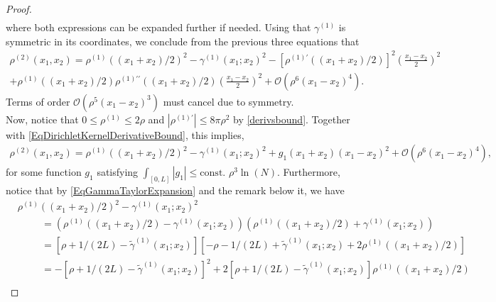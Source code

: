 \documentclass[a4paper,11pt]{article}
\newcommand{\abs}[1]{\left\lvert #1 \right\rvert}
\numberwithin{equation}{section}
\begin{document}
\begin{proof}
\begin{equation}
\begin{aligned}
		\end{aligned}
		\end{equation}
		where both expressions can be expanded further if needed. Using that $ \gamma^{(1)} $ is symmetric in its coordinates, we conclude from the previous three equations that \begin{equation}
		\begin{aligned}
		\rho^{(2)}(x_1,x_2)=\rho^{(1)}((x_1+x_2)/2)^2-\gamma^{(1)}(x_1;x_2)^2-\left[\rho^{(1)\prime}((x_1+x_2)/2)\right]^2\left(\frac{x_1-x_2}{2}\right)^2\\+\rho^{(1)}((x_1+x_2)/2)\rho^{(1)\prime\prime}((x_1+x_2)/2)\left(\frac{x_1-x_2}{2}\right)^2+\mathcal{O}(\rho^6(x_1-x_2)^4).
		\end{aligned}
		\end{equation}
		Terms of order $ \mathcal{O}(\rho^5(x_1-x_2)^3) $ must cancel due to symmetry.\\
		Now, notice that $ 0\leq\rho^{(1)}\leq 2\rho $ and $\abs{\rho^{(1)'}}\leq 8\pi \rho^2 $ by \eqref{derivsbound}. Together with \eqref{EqDirichletKernelDerivativeBound}, this implies,
		\begin{equation}
		\begin{aligned}
            \label{firsteqlem}
		\rho^{(2)}(x_1,x_2)=\rho^{(1)}((x_1+x_2)/2)^2-\gamma^{(1)}(x_1;x_2)^2+g_1(x_1+x_2)(x_1-x_2)^2+\mathcal{O}(\rho^6(x_1-x_2)^4),
		\end{aligned}
		\end{equation}
		for some function $ g_1 $ satisfying $ \int_{[0,L]}\abs{g_1}\leq \text{const. }\rho^3\ln(N)$.
		Furthermore, notice that by \eqref{EqGammaTaylorExpansion} and the remark below it, we have 
		\begin{equation}
		\begin{aligned}
            \label{secondeqlem}
		&\rho^{(1)}((x_1+x_2)/2)^2-\gamma^{(1)}(x_1;x_2)^2\\
		&\hspace{1cm}=(\rho^{(1)}((x_1+x_2)/2)-\gamma^{(1)}(x_1;x_2))(\rho^{(1)}((x_1+x_2)/2)+\gamma^{(1)}(x_1;x_2))\\&\hspace{1cm}
		=\left[\rho+1/(2L)-\tilde{\gamma}^{(1)}(x_1;x_2)\right]\left[-\rho-1/(2L)+\tilde{\gamma}^{(1)}(x_1;x_2)+2\rho^{(1)}((x_1+x_2)/2)\right]\\&\hspace{1cm}
		=-\left[\rho+1/(2L)-\tilde{\gamma}^{(1)}(x_1;x_2)\right]^2+2\left[\rho+1/(2L)-\tilde{\gamma}^{(1)}(x_1;x_2)\right]\rho^{(1)}((x_1+x_2)/2)\\&\hspace{1cm}

\end{aligned}
\end{equation}
\end{proof}
\end{document}
